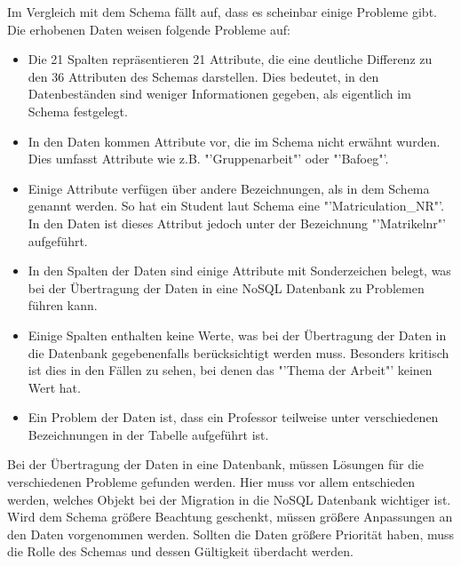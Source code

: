 Im Vergleich mit dem Schema f\"allt auf, dass es scheinbar einige Probleme gibt. Die erhobenen Daten weisen folgende Probleme auf:\\
\begin{itemize}
\item Die 21 Spalten repr\"asentieren 21 Attribute, die eine deutliche Differenz zu den 36 Attributen des Schemas darstellen. Dies bedeutet, in den Datenbest\"anden sind weniger Informationen gegeben, als eigentlich im Schema festgelegt.
\item In den Daten kommen Attribute vor, die im Schema nicht erw\"ahnt wurden. Dies umfasst Attribute wie z.B. "'Gruppenarbeit"' oder "'Bafoeg"'.
\item Einige Attribute verfügen über andere Bezeichnungen, als in dem Schema genannt werden. So hat ein Student laut Schema eine "'Matriculation\_NR"'. In den Daten ist dieses Attribut jedoch unter der Bezeichnung "'Matrikelnr"' aufgef\"uhrt.
\item In den Spalten der Daten sind einige Attribute mit Sonderzeichen belegt, was bei der \"Ubertragung der Daten in eine NoSQL Datenbank zu Problemen führen kann.
\item Einige Spalten enthalten keine Werte, was bei der \"Ubertragung der Daten in die Datenbank gegebenenfalls ber\"ucksichtigt werden muss. Besonders kritisch ist dies in den F\"allen zu sehen, bei denen das "'Thema der Arbeit"' keinen Wert hat.
\item Ein Problem der Daten ist, dass ein Professor teilweise unter verschiedenen Bezeichnungen in der Tabelle aufgeführt ist. \\
\end{itemize}

Bei der \"Ubertragung der Daten in eine Datenbank, müssen L\"osungen für die verschiedenen Probleme gefunden werden. Hier muss vor allem entschieden werden, welches Objekt bei der Migration in die NoSQL Datenbank wichtiger ist. Wird dem Schema gr\"o\ss{}ere Beachtung geschenkt, m\"ussen gr\"o\ss{}ere Anpassungen an den Daten vorgenommen werden. Sollten die Daten gr\"o\ss{}ere Priorit\"at haben, muss die Rolle des Schemas und dessen G\"ultigkeit \"uberdacht werden.\\
